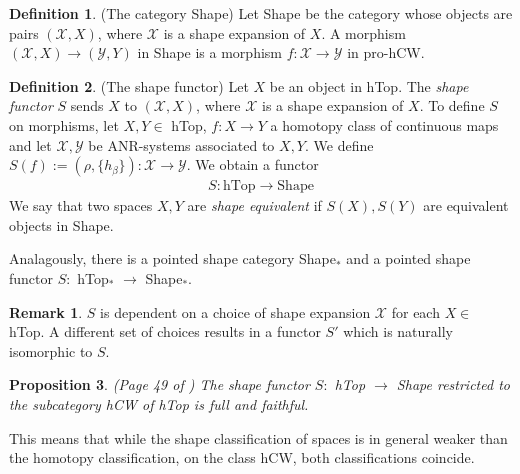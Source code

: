 \documentclass[a4paper,11pt]{article}
\theoremstyle{definition}
\newtheorem{definition}{Definition}[section]
\newtheorem*{remark}{Remark}
\theoremstyle{plain}
\newtheorem{prop}[definition]{Proposition}
\theoremstyle{remark}
\begin{document}
{\begin{definition} (The category Shape) Let Shape be the category whose objects are pairs $(\mathcal{X},X)$, where $\mathcal{X}$ is a shape expansion of $X$. A morphism $(\mathcal{X},X)\rightarrow (\mathcal{Y},Y)$ in Shape is a morphism $f: \mathcal{X} \rightarrow \mathcal{Y}$ in pro-hCW. 
\end{definition}

\begin{definition} (The shape functor) Let $X$ be an object in hTop. The \textit{shape functor} $S$ sends $X$ to $(\mathcal{X},X)$, where $\mathcal{X}$ is a shape expansion of $X$. To define $S$ on morphisms, let $X,Y\in $ hTop, $f: X\rightarrow Y$ a homotopy class of continuous maps and let $\mathcal{X},\mathcal{Y}$ be ANR-systems associated to $X,Y$. We define $S(f):= (\rho,\{h_{\beta}\}):  \mathcal{X}\rightarrow \mathcal{Y}$. We obtain a functor
\begin{align*}
S: \text{hTop} \rightarrow \text{Shape}
\end{align*}
We say that two spaces $X,Y$ are \textit{shape equivalent} if $S(X),S(Y)$ are equivalent objects in Shape. 
\end{definition}

Analagously, there is a pointed shape category Shape$_{\ast}$ and a pointed shape functor $S:$ hTop$_{\ast}$ $\rightarrow$ Shape$_{\ast}$. 

\begin{remark} $S$ is dependent on a choice of shape expansion $\mathcal{X}$ for each $X\in$ hTop. A different set of choices results in a functor $S'$ which is naturally isomorphic to $S$. 
\end{remark}

\begin{prop} (Page 49 of  \cite{mardesic1982shape}) The shape functor $S:$ hTop $\rightarrow$ Shape restricted to the subcategory hCW of hTop is full and faithful. 
\end{prop}

This means that while the shape classification of spaces is in general weaker than the homotopy classification, on the class hCW, both classifications coincide.

}
\end{document}
